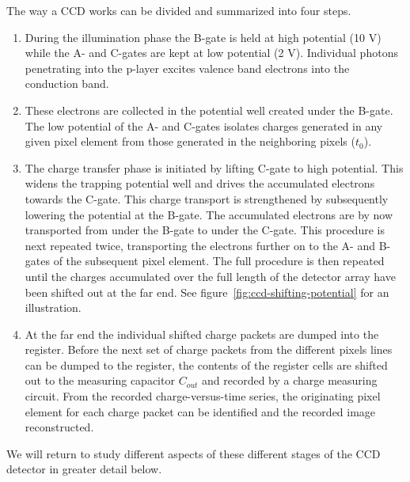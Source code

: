 The way a CCD works can be divided and summarized into four steps.
\begin{enumerate}
	\item During the illumination phase 
		the B-gate is held at high potential
(10 V) while the A- and C-gates are kept at low potential (2
V). Individual photons penetrating into the p-layer excites valence
band electrons into the conduction band.

\item These electrons are collected in the potential well created under
the B-gate. The low potential of the A- and C-gates isolates charges
generated in any given pixel element from those generated in the
neighboring pixels ($t_0$). 

\item The charge transfer phase is initiated by lifting C-gate to high
potential. This widens the trapping potential well and drives the
accumulated electrons towards the C-gate. This charge transport is
strengthened by subsequently lowering the potential at the B-gate. The
accumulated electrons are by now transported from under the B-gate to
under the C-gate. This procedure is next repeated twice, transporting
the electrons further on to the A- and B-gates of the subsequent pixel
element. The full procedure is then repeated until the charges
accumulated over the full length of the detector array have been
shifted out at the far end. See figure~\ref{fig:ccd-shifting-potential} for
an illustration.

\item At the far end the individual shifted charge packets are dumped into
the register. Before the next set of charge packets from the different
pixels lines can be dumped to the register, the contents of the
register cells are shifted out to the measuring capacitor $C_{out}$ and
recorded by a charge measuring circuit. From the recorded
charge-versus-time series, the originating pixel element for each
charge packet can be identified and the recorded image reconstructed.
\end{enumerate}

We will return to study different aspects of these different stages of
the CCD detector in greater detail below.

